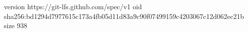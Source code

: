 version https://git-lfs.github.com/spec/v1
oid sha256:bd1294d7977615c173a4fb05d11d83a9c90f07499159c4203067c12d062ec21b
size 938
